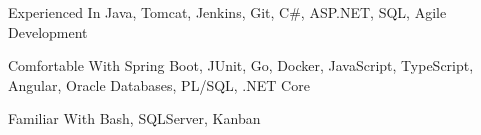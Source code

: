 

\begin{cvskills}

  \cvskill
    {Experienced In} %
    {Java, Tomcat, Jenkins, Git, C\#, ASP.NET, SQL, Agile Development} %

  \cvskill
    {Comfortable With} %
    {Spring Boot, JUnit, Go, Docker, JavaScript, TypeScript, Angular, Oracle Databases, PL/SQL, .NET Core} %

  \cvskill
    {Familiar With} %
    {Bash, SQLServer, Kanban} %

\end{cvskills}
